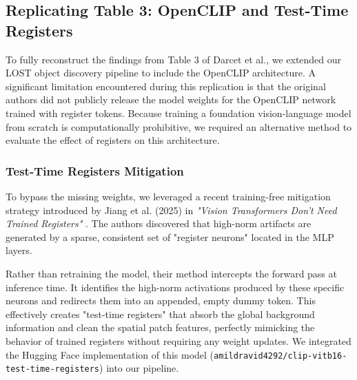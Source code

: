 \documentclass[12pt]{article}
\begin{document}
\subsection{Replicating Table 3: OpenCLIP and Test-Time Registers}

To fully reconstruct the findings from Table 3 of Darcet et al.\cite{darcet2024vision}, we extended our LOST object discovery pipeline to include the OpenCLIP architecture. A significant limitation encountered during this replication is that the original authors did not publicly release the model weights for the OpenCLIP network trained with register tokens. Because training a foundation vision-language model from scratch is computationally prohibitive, we required an alternative method to evaluate the effect of registers on this architecture.

\subsubsection{Test-Time Registers Mitigation}
To bypass the missing weights, we leveraged a recent training-free mitigation strategy introduced by Jiang et al. (2025) in \textit{"Vision Transformers Don't Need Trained Registers"} \cite{jiang2025vision}. The authors discovered that high-norm artifacts are generated by a sparse, consistent set of "register neurons" located in the MLP layers. 

Rather than retraining the model, their method intercepts the forward pass at inference time. It identifies the high-norm activations produced by these specific neurons and redirects them into an appended, empty dummy token. This effectively creates "test-time registers" that absorb the global background information and clean the spatial patch features, perfectly mimicking the behavior of trained registers without requiring any weight updates. We integrated the Hugging Face implementation of this model (\texttt{amildravid4292/clip-vitb16-test-time-registers}) into our pipeline.
\end{document}
